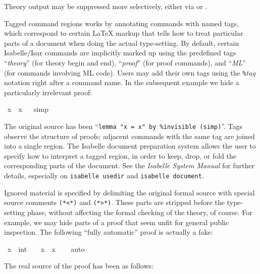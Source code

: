 \begin{isabellebody}
\begin{isamarkuptext}
  \medskip Theory output may be suppressed more selectively, either
  via  or .

  Tagged command regions works by annotating commands with named tags,
  which correspond to certain {\LaTeX} markup that tells how to treat
  particular parts of a document when doing the actual type-setting.
  By default, certain Isabelle/Isar commands are implicitly marked up
  using the predefined tags ``\emph{theory}'' (for theory begin and
  end), ``\emph{proof}'' (for proof commands), and ``\emph{ML}'' (for
  commands involving ML code).  Users may add their own tags using the
  \verb,%,\emph{tag} notation right after a command name.  In the
  subsequent example we hide a particularly irrelevant proof:%
\end{isamarkuptext}%
\isamarkuptrue%
\isamarkupfalse%
\ {\isachardoublequoteopen}x\ {\isacharequal}\ x{\isachardoublequoteclose}%
\isadeliminvisible
\ %
\endisadeliminvisible
%
\isataginvisible
{}\isamarkupfalse%
\ {\isacharparenleft}simp{\isacharparenright}%
\endisataginvisible
{\isafoldinvisible}%
%
\isadeliminvisible
%
\endisadeliminvisible
%
\begin{isamarkuptext}%
The original source has been ``\verb,lemma "x = x" by %invisible (simp),''.
  Tags observe the structure of proofs; adjacent commands with the
  same tag are joined into a single region.  The Isabelle document
  preparation system allows the user to specify how to interpret a
  tagged region, in order to keep, drop, or fold the corresponding
  parts of the document.  See the \emph{Isabelle System Manual}
  \cite{isabelle-sys} for further details, especially on
  \texttt{isabelle usedir} and \texttt{isabelle document}.

  Ignored material is specified by delimiting the original formal
  source with special source comments
  \verb,(,\verb,*,\verb,<,\verb,*,\verb,), and
  \verb,(,\verb,*,\verb,>,\verb,*,\verb,),.  These parts are stripped
  before the type-setting phase, without affecting the formal checking
  of the theory, of course.  For example, we may hide parts of a proof
  that seem unfit for general public inspection.  The following
  ``fully automatic'' proof is actually a fake:%
\end{isamarkuptext}%
\isamarkuptrue%
\isamarkupfalse%
\ {\isachardoublequoteopen}x\ {\isasymnoteq}\ {\isacharparenleft}{}{\isacharcolon}{\isacharcolon}int{\isacharparenright}\ {\isasymLongrightarrow}\ {}\ {\isacharless}\ x\ {\isacharasterisk}\ x{\isachardoublequoteclose}\isanewline
%
\isadelimproof
\ \ %
\endisadelimproof
%
\isatagproof
{}\isamarkupfalse%
\ {\isacharparenleft}auto{\isacharparenright}%
\endisatagproof
{\isafoldproof}%
%
\isadelimproof
%
\endisadelimproof
%
\begin{isamarkuptext}%
\noindent The real source of the proof has been as follows:


\end{isamarkuptext}
\end{isabellebody}
